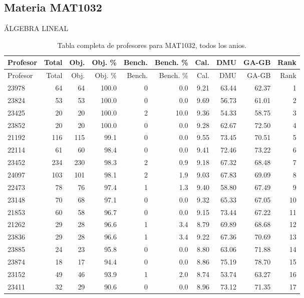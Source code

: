 \subsection{Materia MAT1032}

ÁLGEBRA LINEAL

\begingroup
\scriptsize
\setlength{\tabcolsep}{3pt}
\begin{longtable}{lrrrrrrrrr}
\caption{Tabla completa de profesores para MAT1032, todos los anios.}\label{tab:prof-global-mat1032}\\
\toprule
Profesor & Total & Obj. & Obj. \% & Bench. & Bench. \% & Cal. & DMU & GA-GB & Rank \\
\midrule
\endfirsthead
\toprule
Profesor & Total & Obj. & Obj. \% & Bench. & Bench. \% & Cal. & DMU & GA-GB & Rank \\
\midrule
\endhead
23978 & 64 & 64 & 100.0 & 0 & 0.0 & 9.21 & 63.44 & 62.37 & 1 \\
23824 & 53 & 53 & 100.0 & 0 & 0.0 & 9.69 & 56.73 & 61.01 & 2 \\
23425 & 20 & 20 & 100.0 & 2 & 10.0 & 9.36 & 54.33 & 58.75 & 3 \\
23852 & 20 & 20 & 100.0 & 0 & 0.0 & 9.28 & 62.67 & 72.50 & 4 \\
21192 & 116 & 115 & 99.1 & 0 & 0.0 & 9.55 & 73.45 & 70.51 & 5 \\
22114 & 61 & 60 & 98.4 & 0 & 0.0 & 9.41 & 72.46 & 73.22 & 6 \\
23452 & 234 & 230 & 98.3 & 2 & 0.9 & 9.18 & 67.32 & 68.48 & 7 \\
24097 & 103 & 101 & 98.1 & 2 & 1.9 & 9.03 & 67.83 & 69.09 & 8 \\
22473 & 78 & 76 & 97.4 & 1 & 1.3 & 9.40 & 58.80 & 67.49 & 9 \\
23148 & 70 & 68 & 97.1 & 0 & 0.0 & 9.32 & 65.33 & 67.05 & 10 \\
21853 & 60 & 58 & 96.7 & 0 & 0.0 & 9.15 & 73.44 & 67.22 & 11 \\
21262 & 29 & 28 & 96.6 & 1 & 3.4 & 8.79 & 69.89 & 68.68 & 12 \\
23836 & 29 & 28 & 96.6 & 1 & 3.4 & 9.22 & 67.36 & 70.69 & 13 \\
23885 & 24 & 23 & 95.8 & 0 & 0.0 & 8.80 & 63.06 & 71.88 & 14 \\
23874 & 18 & 17 & 94.4 & 0 & 0.0 & 8.86 & 75.19 & 78.70 & 15 \\
23152 & 49 & 46 & 93.9 & 1 & 2.0 & 8.74 & 53.74 & 63.27 & 16 \\
23411 & 32 & 29 & 90.6 & 0 & 0.0 & 8.96 & 73.12 & 71.35 & 17 \\

\end{longtable}
